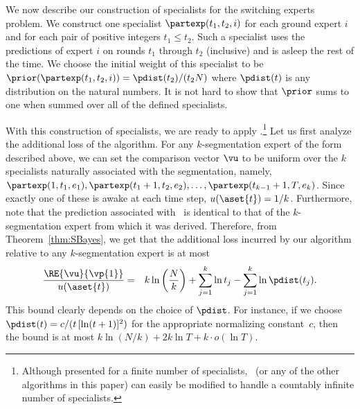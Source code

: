 We now describe our construction of specialists for the switching
experts problem.
We construct one specialist $\partexp(t_1,t_2,i)$
for each ground expert $i$ and for each pair of positive integers
$t_1\leq t_2$.
Such a specialist uses the predictions of expert $i$ on rounds $t_1$
through $t_2$ (inclusive) and is asleep the rest of the time.
We choose the initial weight of this specialist to be
$\prior(\partexp(t_1,t_2,i)) = {\pdist(t_2) / (t_2 N)}$
where $\pdist(t)$ is any distribution on the natural numbers.
It is not hard to show that $\prior$ sums to one when summed over all of the
defined specialists.

With this construction of specialists, we are ready to apply
\SBayes.\footnote{Although presented for a finite number of
specialists, \SBayes\ (or any of the other algorithms in this paper)
can easily be modified to handle a countably infinite number of specialists.}
Let us first analyze the additional loss of the algorithm.
For any $k$-segmentation expert of the form described above,
we can set the comparison vector $\vu$ to be uniform over the
$k$ specialists naturally associated with the segmentation, namely,
$\partexp(1,t_1,e_1),\partexp(t_1+1,t_2,e_2),\ldots,\partexp(t_{k-1}+1,T,e_k)$.
Since exactly one of these is awake at each time step,
${u}(\aset{t}) = 1/ k$.
Furthermore, note that the prediction associated with \vu\ is
identical to that of the $k$-segmentation expert from which it was derived.
Therefore, from
Theorem~\ref{thm:SBayes}, we get that
the additional loss incurred by our algorithm
relative to any $k$-segmentation expert is at most
\begin{eqnarray*}
\frac{\RE{\vu}{\vp{1}}}{u(\aset{t})}
&=& k \ln\left(\frac{N}{k}\right) + 
\sum_{j=1}^{k} \ln t_j
-
\sum_{j=1}^{k} \ln \pdist(t_j).
\end{eqnarray*}
This bound clearly depends on the choice of $\pdist$.
For instance, if we choose $\pdist(t) = c / (t \, [\ln (t+1)]^2)$ for the
appropriate normalizing constant~$c$, then the bound is at most
$k \ln(N/k) + 2 k \ln T + k\cdot o(\ln T)$.

